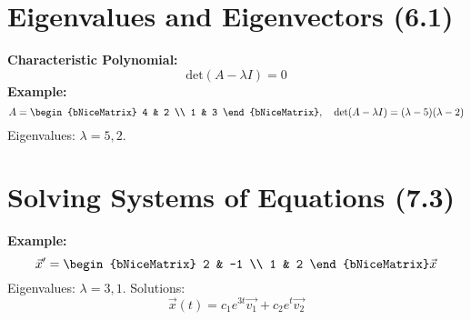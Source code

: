 \documentclass[10pt]{article}
\begin{document}
\begin{multicols}{2}
\section*{Eigenvalues and Eigenvectors (6.1)}
\textbf{Characteristic Polynomial:}
\[
\text{det}(A - \lambda I) = 0
\]
\textbf{Example:}
\[
A = \begin{bNiceMatrix}
4 & 2 \\ 
1 & 3
\end{bNiceMatrix}, \quad \text{det}(A - \lambda I) = (\lambda - 5)(\lambda - 2)
\]
Eigenvalues: \( \lambda = 5, 2 \).

\section*{Solving Systems of Equations (7.3)}
\textbf{Example:}
\[
\vec{x}' = \begin{bNiceMatrix}
2 & -1 \\ 
1 & 2
\end{bNiceMatrix} \vec{x}
\]
Eigenvalues: \( \lambda = 3, 1 \).  
Solutions:
\[
\vec{x}(t) = c_1e^{3t}\vec{v_1} + c_2e^{t}\vec{v_2}
\]

\end{multicols}
\end{document}
